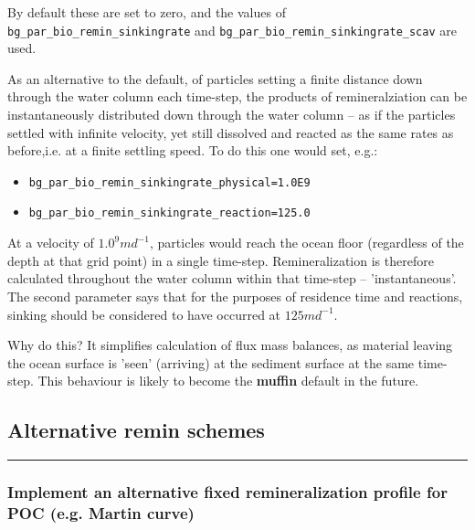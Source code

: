 By default these are set to zero, and the values of \texttt{bg\_par\_bio\_remin\_sinkingrate} and \texttt{bg\_par\_bio\_remin\_sinkingrate\_scav} are used.

As an alternative to the default, of particles setting a finite distance down through the water column each time-step, the products of remineralziation can be instantaneously distributed down through the water column -- as if the particles settled with infinite velocity, yet still dissolved and reacted as the same rates as before,i.e. at a finite settling speed. To do this one would set, e.g.:
\vspace{1mm}
\begin{itemize}[noitemsep]
\item[] \texttt{bg\_par\_bio\_remin\_sinkingrate\_physical=1.0E9}
\item[] \texttt{bg\_par\_bio\_remin\_sinkingrate\_reaction=125.0}
\end{itemize}
\vspace{1mm}
At a velocity of \(1.0^{9}md^{-1}\), particles would reach the ocean floor (regardless of the depth at that grid point) in a single time-step. Remineralization is therefore calculated throughout the water column within that time-step -- 'instantaneous'. The second parameter says that for the purposes of residence time and reactions, sinking should be considered to have occurred at \(125md^{-1}\).

Why do this? It simplifies calculation of flux mass balances, as material leaving the ocean surface is 'seen' (arriving) at the sediment surface at the same time-step. This behaviour is likely to become the \textbf{muffin} default in the future.

%
\newpage
\subsection*{Alternative remin schemes}
\vspace{1mm}

\hfill \break

%
\noindent\rule{4cm}{0.5pt}
\subsubsection{Implement an alternative fixed remineralization profile for POC (e.g. Martin curve)}
\vspace{1mm}

